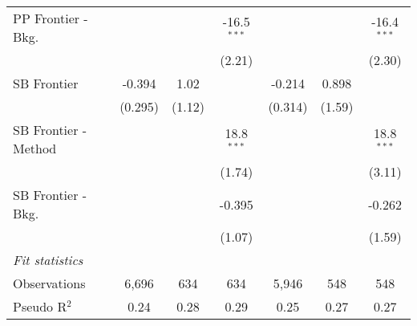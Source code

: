 \begin{tabular}{lcccccc}
   PP Frontier - Bkg.   &               &               & -16.5$^{***}$ &              &               & -16.4$^{***}$\\   
                        &               &               & (2.21)        &              &               & (2.30)\\   
   SB Frontier          & -0.394        & 1.02          &               & -0.214       & 0.898         &   \\   
                        & (0.295)       & (1.12)        &               & (0.314)      & (1.59)        &   \\   
   SB Frontier - Method &               &               & 18.8$^{***}$  &              &               & 18.8$^{***}$\\   
                        &               &               & (1.74)        &              &               & (3.11)\\   
   SB Frontier - Bkg.   &               &               & -0.395        &              &               & -0.262\\   
                        &               &               & (1.07)        &              &               & (1.59)\\   
   \midrule
   \emph{Fit statistics}\\
   Observations         & 6,696         & 634           & 634           & 5,946        & 548           & 548\\  
   Pseudo R$^2$         & 0.24          & 0.28          & 0.29          & 0.25         & 0.27          & 0.27\\  
   

\end{tabular}
